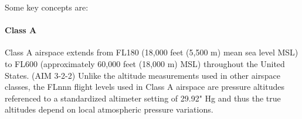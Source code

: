 


Some key concepts are:

\paragraph{Class A}
Class A airspace extends from FL180 (18,000 feet (5,500 m) mean sea level MSL) to FL600 (approximately 60,000 feet (18,000 m) MSL) throughout the United States. (AIM 3-2-2) Unlike the altitude measurements used in other airspace classes, the FLnnn flight levels used in Class A airspace are pressure altitudes referenced to a standardized altimeter setting of 29.92" Hg and thus the true altitudes depend on local atmospheric pressure variations.

